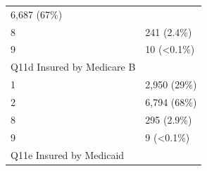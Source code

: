 \documentclass[]{article}
\begin{document}
\begin{longtable}[]{@{}ll@{}}
\begin{minipage}[t]{0.23\columnwidth}
6,687 (67\%)\strut
\end{minipage}\tabularnewline
\begin{minipage}[t]{0.71\columnwidth}\raggedright
8\strut
\end{minipage} & \begin{minipage}[t]{0.23\columnwidth}\raggedright
241 (2.4\%)\strut
\end{minipage}\tabularnewline
\begin{minipage}[t]{0.71\columnwidth}\raggedright
9\strut
\end{minipage} & \begin{minipage}[t]{0.23\columnwidth}\raggedright
10 (\textless0.1\%)\strut
\end{minipage}\tabularnewline
\begin{minipage}[t]{0.71\columnwidth}\raggedright
Q11d Insured by Medicare B\strut
\end{minipage} & \begin{minipage}[t]{0.23\columnwidth}\raggedright
\strut
\end{minipage}\tabularnewline
\begin{minipage}[t]{0.71\columnwidth}\raggedright
1\strut
\end{minipage} & \begin{minipage}[t]{0.23\columnwidth}\raggedright
2,950 (29\%)\strut
\end{minipage}\tabularnewline
\begin{minipage}[t]{0.71\columnwidth}\raggedright
2\strut
\end{minipage} & \begin{minipage}[t]{0.23\columnwidth}\raggedright
6,794 (68\%)\strut
\end{minipage}\tabularnewline
\begin{minipage}[t]{0.71\columnwidth}\raggedright
8\strut
\end{minipage} & \begin{minipage}[t]{0.23\columnwidth}\raggedright
295 (2.9\%)\strut
\end{minipage}\tabularnewline
\begin{minipage}[t]{0.71\columnwidth}\raggedright
9\strut
\end{minipage} & \begin{minipage}[t]{0.23\columnwidth}\raggedright
9 (\textless0.1\%)\strut
\end{minipage}\tabularnewline
\begin{minipage}[t]{0.71\columnwidth}\raggedright
Q11e Insured by Medicaid\strut
\end{minipage} & \begin{minipage}[t]{0.23\columnwidth}\raggedright

\end{minipage}
\end{longtable}
\end{document}
